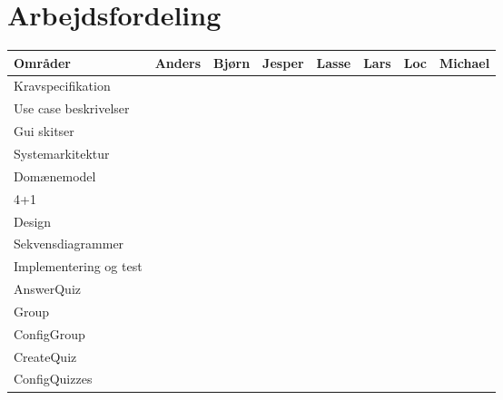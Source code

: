 \chapter*{Arbejdsfordeling}




\begin{tabular}{|l|c|c|c|c|c|c|c|}
\hline 
\rowcolor{Gray}
\textbf{Områder} 			& Anders 		& Bjørn 	& Jesper 		& Lasse 	& Lars 		& Loc 		& Michael \\ 
\hline

Kravspecifikation 		&\checkmark &\checkmark	&\checkmark	&\checkmark	&\checkmark	&\checkmark	&\checkmark \\ 
\hline

Use case beskrivelser 		&\checkmark &\checkmark	&\checkmark	&\checkmark	&\checkmark	&\checkmark	&\checkmark \\ 
\hline

Gui skitser 		&\checkmark &	&\checkmark	&\checkmark	&\checkmark	&	&	\\ 
\hline

\rowcolor{Gray}
Systemarkitektur 		&\multicolumn{7}{c|}{ } \\ 
\hline
Domænemodel		&	&	&	&	& 	&\checkmark	&	 \\ 
\hline

4+1		&	&\checkmark	&\checkmark	&\checkmark	&\checkmark 	&	&	 \\ 
\hline

\rowcolor{Gray}
Design 		&\multicolumn{7}{c|}{ } \\ 
\hline
Sekvensdiagrammer		&	&\checkmark	&	&	& 	&	&\checkmark	 \\ 
\hline

\rowcolor{Gray}
Implementering og test 		&\multicolumn{7}{c|}{ } \\ 
\hline

AnswerQuiz		&\checkmark	&\checkmark	&	&\checkmark	& 	&	&	 \\ 
\hline

Group		&	&	&\checkmark	&	& 	&	& \\ 
\hline

ConfigGroup		&	&	&	&	& 	&	&\checkmark	 \\ 
\hline

CreateQuiz	&	&	&	&\checkmark	&\checkmark 	&	& \\ 
\hline

ConfigQuizzes 		&	&\checkmark	&	&\checkmark	& 	&	& \\ 
\hline 


\end{tabular}
